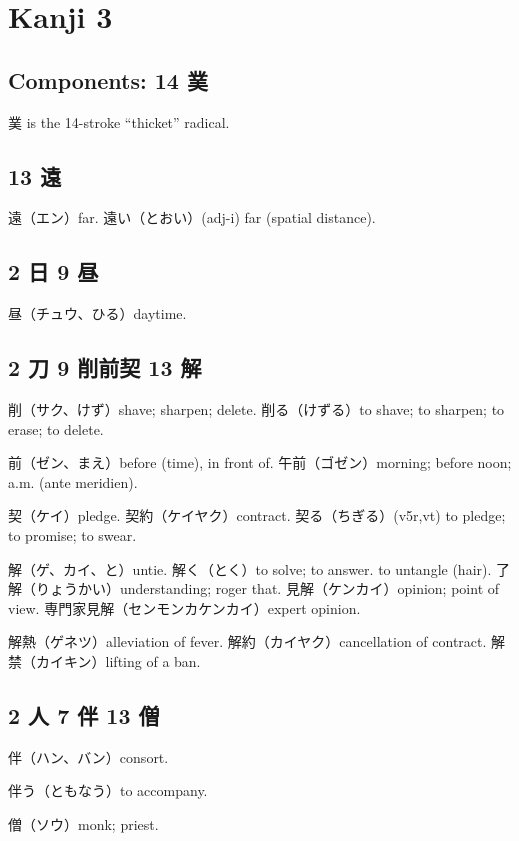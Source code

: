 \chapter{Kanji 3}

\section{Components: 14 菐}

菐 is the 14-stroke ``thicket'' radical.

\section{13 遠}

遠（エン）far.
遠い（とおい）(adj-i) far (spatial distance).

\section{2 日 9 昼}

昼（チュウ、ひる）daytime.

\section{2 刀 9 削前契 13 解}

削（サク、けず）shave; sharpen; delete.
削る（けずる）to shave; to sharpen; to erase; to delete.

前（ゼン、まえ）before (time), in front of.
午前（ゴゼン）morning; before noon; a.m. (ante meridien).

契（ケイ）pledge.
契約（ケイヤク）contract.
契る（ちぎる）(v5r,vt) to pledge; to promise; to swear.

解（ゲ、カイ、と）untie.
解く（とく）to solve; to answer. to untangle (hair).
了解（りょうかい）understanding; roger that.
見解（ケンカイ）opinion; point of view.
専門家見解（センモンカケンカイ）expert opinion.

解熱（ゲネツ）alleviation of fever.
解約（カイヤク）cancellation of contract.
解禁（カイキン）lifting of a ban.

\section{2 人 7 伴 13 僧}

伴（ハン、バン）consort.

伴う（ともなう）to accompany.

僧（ソウ）monk; priest.

